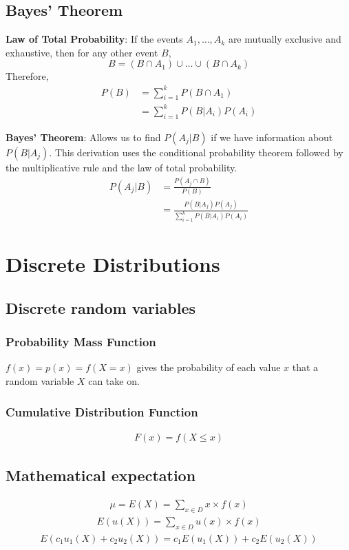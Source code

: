 \documentclass{article}
\begin{document}
\begin{multicols*}{2}
\subsection{Bayes' Theorem}

\textbf{Law of Total Probability}: If the events $A_1, \ldots, A_k$ are mutually exclusive and exhaustive, then for any other event $B$,
\begin{equation*}
    B = (B \cap A_1) \cup \ldots \cup (B \cap A_k)
\end{equation*}
Therefore,
\begin{align*}
    P(B) &= \sum_{i = 1}^k P(B \cap A_1) \\
    &= \sum_{i = 1}^k P(B|A_i) P(A_i)
\end{align*}

\textbf{Bayes' Theorem}:
Allows us to find $P(A_j|B)$ if we have information about $P(B|A_j)$. This derivation uses the conditional probability theorem followed by the multiplicative rule and the law of total probability.
\begin{align*}
    P(A_j|B) &= \frac{P(A_j \cap B)}{P(B)} \\
    &= \frac{P(B|A_j) P(A_j)}{\sum_{i = 1}^k P(B|A_i) P(A_i)}
\end{align*}

\section{Discrete Distributions}

\subsection{Discrete random variables}

\subsubsection{Probability Mass Function}
$f(x) = p(x) = f(X = x)$ gives the probability of each value $x$ that a random variable $X$ can take on.

\subsubsection{Cumulative Distribution Function}
\begin{align*}
    F(x) = f(X \leq x)
\end{align*}

\subsection{Mathematical expectation}
\begin{align*}
    \mu = E(X) = \sum_{x \in D} x \times f(x)
\end{align*}
\begin{align*}
    E(u(X)) = \sum_{x \in D} u(x) \times f(x)
\end{align*}
\begin{align*}
    E(c_1 u_1(X) + c_2 u_2(X)) = c_1 E(u_1(X)) + c_2 E(u_2(X))
\end{align*}


\end{multicols*}
\end{document}

